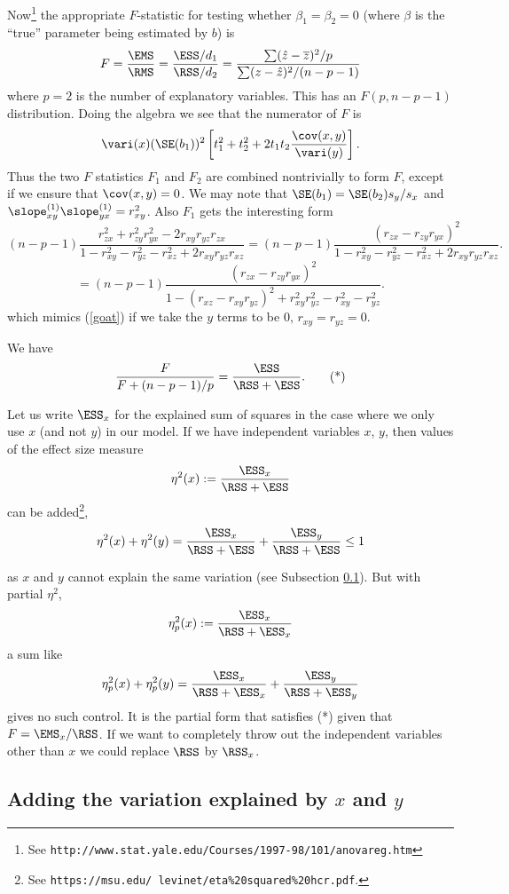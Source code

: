Now\footnote{See \texttt{http://www.stat.yale.edu/Courses/1997-98/101/anovareg.htm}} the appropriate $F$-statistic for testing whether $\beta_1=\beta_2=0$ (where $\beta$ is the ``true'' parameter being estimated by $b$) is
\[
	F
	=\frac{\EMS}{\RMS}
	=\frac{\ESS/d_1}{\RSS/d_2}
	=\frac{\sum (\hat z-\overline z)^2/p}{\sum(z-\hat z)^2/(n-p-1)}
\]
where $p=2$ is the number of explanatory variables. This has an $F(p,n-p-1)$ distribution.
Doing the algebra we see that the numerator of $F$ is 
\[
	\vari(x) (\SE(b_1))^2 \left[ t_1^2+t_2^2 + 2t_1t_2 \frac{\cov(x,y)}{\vari(y)}\right].
\]
Thus the two $F$ statistics $F_1$ and $F_2$ are combined nontrivially to form $F$, except if we ensure that $\cov(x,y)=0$.
We may note that $\SE(b_1)=\SE(b_2) s_y/s_x$ and $\slope^{(1)}_{xy}\slope^{(1)}_{yx}=r_{xy}^2$.
Also $F_1$ gets the interesting form
\[
	(n-p-1)\frac{r_{zx}^2+r_{zy}^2r_{yx}^2 - 2r_{xy}r_{yz}r_{zx}}{1-r_{xy}^2-r_{yz}^2-r_{xz}^2+2r_{xy}r_{yz}r_{xz}}
	=
	(n-p-1)\frac{(r_{zx}-r_{zy}r_{yx})^2}{1-r_{xy}^2-r_{yz}^2-r_{xz}^2+2r_{xy}r_{yz}r_{xz}}.
\]
\[
	=
	(n-p-1)\frac{(r_{zx}-r_{zy}r_{yx})^2}{1- (r_{xz}-r_{xy}r_{yz})^2+r_{xy}^2r_{yz}^2-r_{xy}^2-r_{yz}^2}.
\]
which mimics (\ref{goat}) if we take the $y$ terms to be 0, $r_{xy}=r_{yz}=0$.

We have
\[
	\frac{F}{F+(n-p-1)/p} = \frac{\ESS}{\RSS+\ESS}.\tag{*}
\]

Let us write $\ESS_x$ for the explained sum of squares in the case where we only use $x$ (and not $y$) in our model.
If we have independent variables $x$, $y$, then values of the effect size measure
\[
\eta^2(x):=\frac{\ESS_x}{\RSS+\ESS}
\]
can be added\footnote{See \texttt{https://msu.edu/~levinet/eta\%20squared\%20hcr.pdf}.},
\[
\eta^2(x)+\eta^2(y)=\frac{\ESS_x}{\RSS+\ESS} + \frac{\ESS_y}{\RSS+\ESS}\le 1
\]

as $x$ and $y$ cannot explain the same variation (see Subsection \ref{levine-hullett-claim}). But with partial $\eta^2$, 
\[
\eta^2_p(x):=\frac{\ESS_x}{\RSS+\ESS_x}
\]
a sum like
\[
\eta_p^2(x)+\eta_p^2(y)=\frac{\ESS_x}{\RSS+\ESS_x} + \frac{\ESS_y}{\RSS+\ESS_y}
\]
gives no such control. It is the partial form that satisfies (*) given that $F=\EMS_x/\RSS$.
If we want to completely throw out the independent variables other than $x$ we could replace $\RSS$ by $\RSS_x$.

\subsection{Adding the variation explained by $x$ and $y$}\label{levine-hullett-claim}

